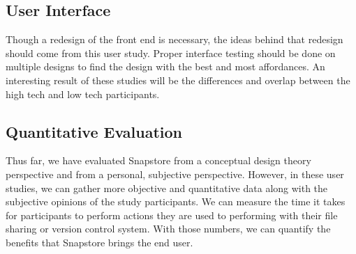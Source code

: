 \subsection{User Interface}

Though a redesign of the front end is necessary, the ideas behind that redesign should come from this user study. Proper interface testing should be done on multiple designs to find the design with the best and most affordances. An interesting result of these studies will be the differences and overlap between the high tech and low tech participants.

\subsection{Quantitative Evaluation}

Thus far, we have evaluated Snapstore from a conceptual design theory perspective and from a personal, subjective perspective. However, in these user studies, we can gather more objective and quantitative data along with the subjective opinions of the study participants. We can measure the time it takes for participants to perform actions they are used to performing with their file sharing or version control system. With those numbers, we can quantify the benefits that Snapstore brings the end user.






